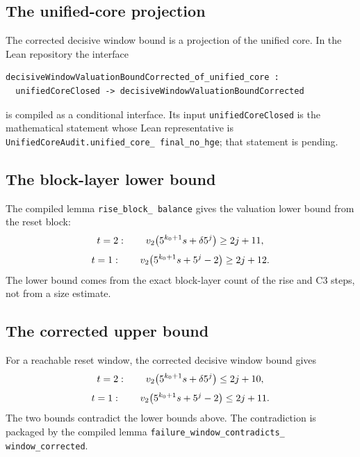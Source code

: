 \subsection{The unified-core projection}

The corrected decisive window bound is a projection of the unified
core.  In the Lean repository the interface
\begin{verbatim}
decisiveWindowValuationBoundCorrected_of_unified_core :
  unifiedCoreClosed -> decisiveWindowValuationBoundCorrected
\end{verbatim}
is compiled as a conditional interface.  Its input
\texttt{unifiedCoreClosed} is the mathematical statement whose Lean
representative is
\texttt{UnifiedCoreAudit.unified\_\allowbreak core\_\allowbreak
final\_\allowbreak no\_\allowbreak hge}; that statement is pending.

\subsection{The block-layer lower bound}

The compiled lemma \texttt{rise\_\allowbreak block\_\allowbreak
balance} gives the valuation lower bound from the reset block:
\begin{equation*}
  t=2:\qquad
  v_2\!\left(5^{k_0+1}s+\delta5^j\right)\ge2j+11,
\end{equation*}
\begin{equation*}
  t=1:\qquad
  v_2\!\left(5^{k_0+1}s+5^j-2\right)\ge2j+12.
\end{equation*}
The lower bound comes from the exact block-layer count of the rise and
C3 steps, not from a size estimate.

\subsection{The corrected upper bound}

For a reachable reset window, the corrected decisive window bound
gives
\begin{equation*}
  t=2:\qquad
  v_2\!\left(5^{k_0+1}s+\delta5^j\right)\le2j+10,
\end{equation*}
\begin{equation*}
  t=1:\qquad
  v_2\!\left(5^{k_0+1}s+5^j-2\right)\le2j+11.
\end{equation*}
The two bounds contradict the lower bounds above.  The contradiction
is packaged by the compiled lemma
\texttt{failure\_\allowbreak window\_\allowbreak contradicts\_\allowbreak
window\_\allowbreak corrected}.

